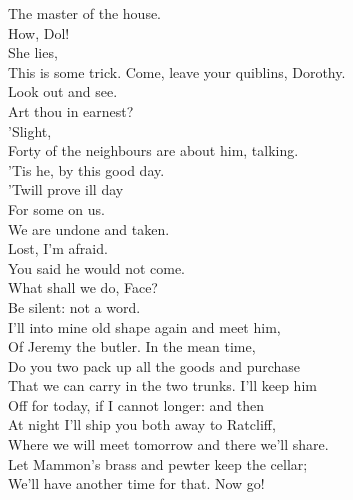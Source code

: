\documentclass[a4paper,oneside,12pt]{memoir}
\begin{document}
\begin{drama*}
The master of the house.\\
\subtlespeaks {} How, Dol!\\
\facespeaks {} She lies,\\
This is some trick. Come, leave your quiblins, Dorothy.\\
\dolspeaks Look out and see.\\
\subtlespeaks {} Art thou in earnest?\\
\dolspeaks {} 'Slight,\\
Forty of the neighbours are about him, talking.\\
\facespeaks 'Tis he, by this good day.\\
\dolspeaks {} 'Twill prove ill day\\
For some on us.\\
\facespeaks {} We are undone and taken.\\
\dolspeaks Lost, I'm afraid.\\
\subtlespeaks {} You said he would not come.\\
What shall we do, Face?\\
\facespeaks {} Be silent: not a word.\\
I'll into mine old shape again and meet him,\\
Of Jeremy the butler. In the mean time,\\
Do you two pack up all the goods and purchase\\
That we can carry in the two trunks. I'll keep him\\
Off for today, if I cannot longer: and then\\
At night I'll ship you both away to Ratcliff,\\
Where we will meet tomorrow and there we'll share.\\
Let Mammon's brass and pewter keep the cellar;\\
We'll have another time for that. Now go!\\

\pagebreak
\scene


\end{drama*}
\end{document}
